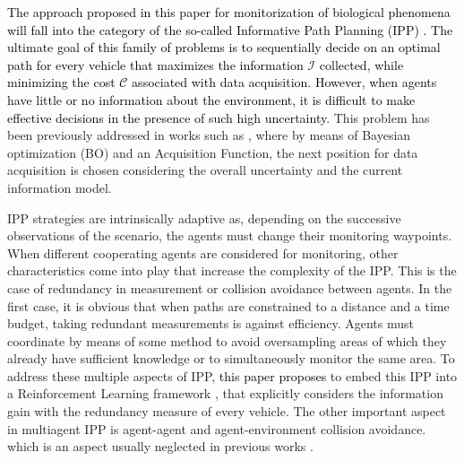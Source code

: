 \documentclass[journal]{IEEEtran}
\newcommand\changes[1]{\textcolor{black}{#1}}
\begin{document}
\changes{The approach proposed in this paper for monitorization of biological phenomena will fall into the category of the so-called Informative Path Planning (IPP) \cite{popovic_informative_2020}. The ultimate goal of this family of problems is to sequentially decide on an optimal path for every vehicle that maximizes the information $\mathcal{I}$ collected, while minimizing the cost $\mathcal{C}$ associated with data acquisition. However, when agents have little or no information about the environment, it is difficult to make effective decisions in the presence of such high uncertainty.} This problem has been previously addressed in works such as \cite{peralta_MULTIOBJECTIVE}, where by means of Bayesian optimization (BO) and an Acquisition Function, the next position for data acquisition is chosen considering the overall uncertainty and the current information model.

IPP strategies are intrinsically adaptive as, depending on the successive observations of the scenario, the agents must change their monitoring waypoints. When different cooperating agents are considered for monitoring, other characteristics come into play that increase the complexity of the IPP. This is the case of redundancy in measurement or collision avoidance between agents. In the first case, it is obvious that when paths are constrained to a distance and a time budget, taking redundant measurements is against efficiency. Agents must coordinate by means of some method to avoid oversampling areas of which they already have sufficient knowledge or to simultaneously monitor the same area. To address these multiple aspects of IPP, \changes{this paper proposes} to embed this IPP into a Reinforcement Learning framework \cite{sutton_reinforcement_2018}, that explicitly considers the information gain with the redundancy measure of every vehicle. The other important aspect in multiagent IPP is agent-agent and agent-environment collision avoidance. which is an aspect usually neglected in previous works  \cite{kathen2022aquafelpso}. 

\end{document}
